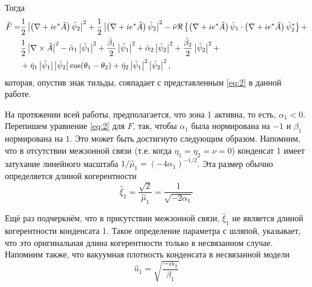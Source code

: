 Тогда
\begin{align}
  \tilde{F} = & \frac{1}{2}\left| \left( \nabla + ie^*\tilde{A} \right)
    \tilde{\psi}_2 \right|^2 + \frac{1}{2}\left| \left( \nabla + ie^*\tilde{A} \right)
    \tilde{\psi}_2 \right|^2 - \tilde{\nu} \Re\left\{ \left( \nabla + ie^*\tilde{A}
    \right)\tilde{\psi}_1 \cdot \left( \nabla + ie^*\tilde{A} \right)
    \tilde{\psi}^*_2 \right\} + \nonumber \\
  & \frac{1}{2}\left| \nabla\times\tilde{A} \right|^2 - \tilde{\alpha}_1
    \left| \tilde{\psi}_1 \right|^2 + \frac{\tilde{\beta}_1}{2}\left| \tilde{\psi}_1 \right|^2 +
    \tilde{\alpha}_2\left| \tilde{\psi}_2 \right|^2 +
    \frac{\tilde{\beta}_2}{2}\left| \tilde{\psi}_2 \right|^2 + \nonumber \\
  & + \tilde{\eta}_1 \left| \tilde{\psi}_1 \right| \left| \tilde{\psi}_2 \right|
    \cos(\theta_1 - \theta_2) + \tilde{\eta}_2\left| \tilde{\psi}_1 \right|^2
    \left| \tilde{\psi}_2 \right|^2, \label{eq:B-3}
\end{align}
которая, опустив знак тильды, совпадает с представленным \eqref{eq:2} в
данной работе.

На протяжении всей работы, предполагается, что зона 1 активна, то есть, 
\( \alpha_1 < 0 \). Перепишем уравнение \eqref{eq:2} для \( F \), так, чтобы 
\( \alpha_1 \) была нормирована на \( -1 \) и \( \beta_1 \) нормирована на 
\( 1 \). Это может быть достигнуто следующим образом. Напомним, что в 
отсутствии межзонной связи (т.е. когда \( \eta_1 = \eta_2 = \nu = 0 \)) 
конденсат 1 имеет затухание линейного масштаба 
\( 1/\hat{\mu}_1 = (-4\alpha_1)^{-1/2} \). Эта размер обычно определяется 
длиной когерентности
\begin{equation}
    \hat{\xi}_1 = \frac{\sqrt{2}}{\hat{\mu}_1} = \frac{1}{\sqrt{-2\alpha_1}}
    \label{eq:A-4}
\end{equation}

Ещё раз подчеркнём, что в присутствии межзонной связи, \( \hat{\xi}_1 \) не
является длиной когерентности конденсата 1. Такое определение параметра с 
шляпой, указывает, что это оригинальная длина когерентности только в 
несвязанном случае. Напомним также, что вакуумная плотность конденсата в 
несвязанной модели
\begin{equation}
    \hat{u}_1 = \sqrt{\frac{-\alpha_1}{\beta_1}}
    \label{eq:B-5}
\end{equation}

